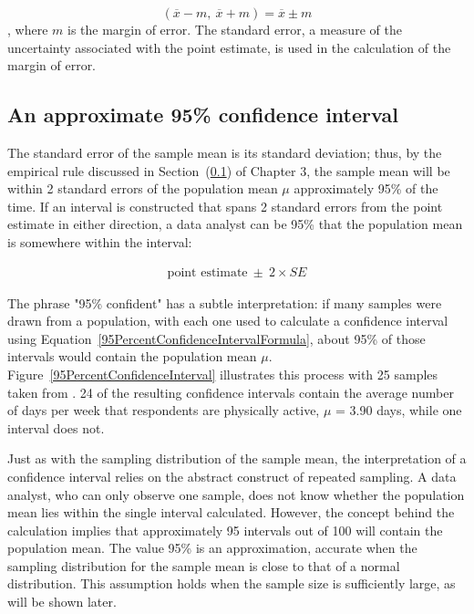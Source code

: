 \begin{spacing}{1.5}
\[(\overline{x} -m, \ \overline{x} + m) = \overline{x} \pm m \],
where $m$ is the margin of error. The standard error, a measure of the uncertainty associated with the point estimate, is used in the calculation of the margin of error.

\subsection{An approximate 95\% confidence interval}

The standard error of the sample mean is its standard deviation; thus, by the empirical rule discussed in Section~(\ref{}) of Chapter 3, the sample mean will be within 2 standard errors of the population mean $\mu$ approximately 95\% of the time. If an interval is constructed that spans 2 standard errors from the point estimate in either direction, a data analyst can be 95\%  that the population mean is somewhere within the interval:

\begin{align}
\text{point estimate}\ \pm\ 2\times SE
\label{95PercentConfidenceIntervalFormula}
\end{align}

The phrase "95\% confident" has a subtle interpretation: if many samples were drawn from a population, with each one used to calculate a confidence interval using Equation~\ref{95PercentConfidenceIntervalFormula}, about 95\% of those intervals would contain the population mean $\mu$. Figure~\ref{95PercentConfidenceInterval} illustrates this process with 25 samples taken from . 24 of the resulting confidence intervals contain the average number of days per week that respondents are physically active, $\mu$ = 3.90 days, while one interval does not. 

Just as with the sampling distribution of the sample mean, the interpretation of a confidence interval relies on the abstract construct of repeated sampling. A data analyst, who can only observe one sample, does not know whether the population mean lies within the single interval calculated. However, the concept behind the calculation implies that approximately 95 intervals out of 100 will contain the population mean. The value 95\% is an approximation, accurate when the sampling distribution for the sample mean is close to that of a normal distribution. This assumption holds when the sample size is sufficiently large, as will be shown later.


\end{spacing}
